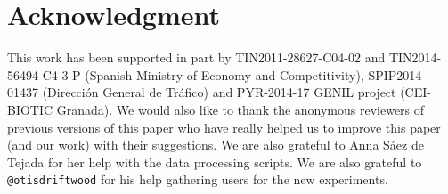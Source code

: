\documentclass[letterpaper]{article}
\begin{document}
\section*{Acknowledgment}

This work has been supported in part by TIN2011-28627-C04-02 and
TIN2014-56494-C4-3-P (Spanish Ministry of Economy and Competitivity),
SPIP2014-01437 (Direcci{\'o}n General de Tr{\'a}fico) and PYR-2014-17
GENIL project (CEI-BIOTIC Granada). We would also like to thank the
anonymous reviewers of previous versions of this paper who have really
helped us to improve 
this paper (and our work) with their suggestions. We are also grateful
to Anna S\'aez de Tejada for her help with the data processing
scripts. We are also grateful to {\tt @otisdriftwood} for his help
gathering users for the new experiments. 




\end{document}
